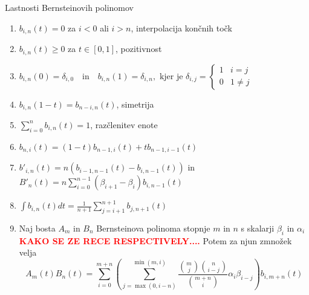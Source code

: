 \documentclass[isrm2, tisk]{fmfdelo}
\newcommand{\lilb}[2]{b_{#1,#2}(t)}
\newcommand{\bigbo}[1]{B'_{#1}(t)}
\newcommand{\bernsteinsumtridva}[2]{\sum_{#1=0}^{#2} \lilb{#1}{#2}}
\newcommand{\mycomment}[1]{\textbf{\textcolor{red}{#1}}}
\begin{document}
    \begin{izrek}{Lastnosti Bernsteinovih polinomov}
        \label{izrek:bernsteinovi_lastnosti}

        \begin{enumerate}
            \item $\lilb{i}{n} = 0$ za $i<0$ ali $i>n$, interpolacija končnih točk \label{izrek:bernsteinovi_lastnosti:interpolacija}
            \item $\lilb{i}{n} \geq 0$ za $t\in[0,1]$, pozitivnost \label{izrek:bernsteinovi_lastnosti:pozitivnost}
            \item $b_{i,n}(0) = \delta_{i,0} \quad \text{in} \quad  b_{i,n}(1) = \delta_{i,n}, \text{ kjer je }  \delta_{i,j} = \begin{cases}
                                                                                                                                    1 & i=j \\
                                                                                                                                    0 & 1\neq j
            \end{cases}$
            \item $b_{i,n}(1-t) = \lilb{n-i}{n}$, simetrija \label{izrek:bernsteinovi_lastnosti:simetrija}
            \item $\bernsteinsumtridva{i}{n} = 1$, razčlenitev enote \label{izrek:bernsteinovi_lastnosti:enota}
            \item $\lilb{n}{i} = (1-t)\lilb{n-1}{i} + t\lilb{n-1}{i-1}$ \label{izrek:bernsteinovi_lastnosti:rekruzija}
            \item $b'_{i,n}(t)=n(\lilb{i-1}{n-1} - \lilb{i}{n-1})$ in  $\bigbo{n}=n\sum^{n-1}_{i=0}(\beta_{i+1}-\beta_{i})b_{i,n-1}(t)$ \label{izrek:bernsteinovi_lastnosti:odvod}
            \item $\int b_{i,n}(t)dt= \frac{1}{n+1}\sum^{n+1}_{j=i+1}b_{j,n+1}(t)$ \label{izrek:bernsteinovi_lastnosti:integral}
            \item{\label{izrek:bernsteinovi_lastnosti:mnozenje} Naj bosta $A_m$ in $B_n$ Bernsteinova polinoma stopnje $m$ in $n$ s skalarji $\beta_i$ in $\alpha_i$ \mycomment{KAKO SE ZE RECE RESPECTIVELY....}
            Potem za njun zmnožek velja
                \[ A_m(t)B_n(t) = \sum_{i=0}^{m+n}\left(\sum_{j=\max(0,i-n)}^{\min(m,i)} \frac{\binom{m}{j}\binom{n}{i-j}}{\binom{m+n}{i}} \alpha_i\beta_{i-j} \right)b_{i,m+n}(t)\]
            }
        \end{enumerate}
    \end{izrek}
\end{document}
